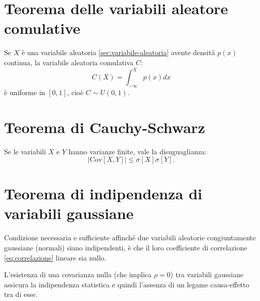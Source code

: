 \section{Teorema delle variabili aleatore comulative} %
\label{sec:variabili-comulative}
Se $X$ è una variabile aleatoria \ref{sec:variabile-aleatoria} avente densità $p(x)$ continua, la variabile aleatoria comulativa $C$:
\begin{equation}
C\left( X \right) =\int _{ -\infty  }^{ X }{ p\left( x \right) dx } 
\end{equation}
è uniforme in $[0,1]$, cioè $C\sim U(0,1)$.

\section{Teorema di Cauchy-Schwarz} %
\label{sec:th-cauchy-schwarz}
Se le variabili $X$ e $Y$ hanno varianze finite, vale la disuguaglianza:
\begin{equation}
\left| \textrm{Cov} \left[ X,Y \right]  \right| \le \sigma\left[ X \right] \sigma \left[ Y \right] .
\end{equation}

\section{Teorema di indipendenza di variabili gaussiane} %
\label{sec:indipendenza-variabili-gaussiane}
Condizione necessaria e sufficiente affinché due variabili aleatorie congiuntamente gaussiane (normali) siano indipendenti, è che il loro coefficiente di correlazione \ref{eq:correlazione} lineare sia nullo.

L'esistenza di una covarianza nulla (che implica $\rho =0$) tra variabili gaussiane assicura la indipendenza statistica e quindi l'assenza di un legame causa-effetto tra di esse.

